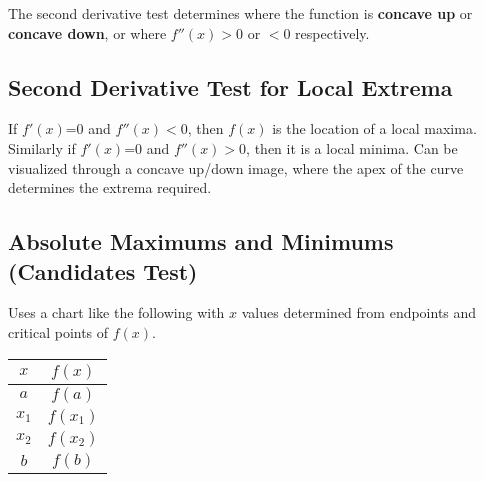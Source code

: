 The second derivative test determines where the function
is \textbf{concave up} or \textbf{concave down}, or where
$f''(x)>0$ or $<0$ respectively.

\bigskip{}

\subsection{Second Derivative Test for Local Extrema}\label{subsec:second-derivative-test-for-local-extrema}

If $f'(x)$=0 and $f''(x)<0$, then $f(x)$ is the location of a local maxima.
Similarly if $f'(x)$=0 and $f''(x)>0$, then it is a local minima.
Can be visualized through a concave up/down image, where the apex of the curve
determines the extrema required.

\subsection{Absolute Maximums and Minimums (Candidates Test)}\label{subsec:absolute-maximums-and-minimumsnullcandidates-testnull}

Uses a chart like the following with $x$ values determined from endpoints and critical points of $f(x)$.

\bigskip
\begin{center}
    \begin{tabular}{|c|c|}
        \hline
        $x$ & $f(x)$\\
        \hline
        $a$ & $f(a)$\\
        \hline
        $x_1$ & $f(x_1)$\\
        \hline
        $x_2$ & $f(x_2)$\\
        \hline
        $b$ & $f(b)$\\
        \hline
    \end{tabular}
\end{center}

